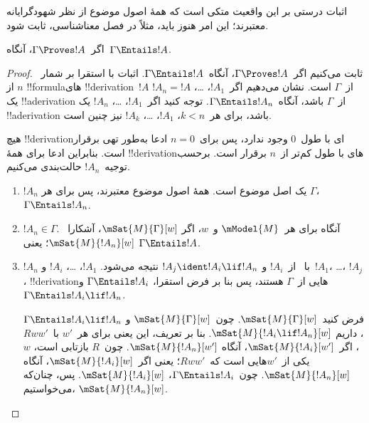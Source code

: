\documentclass[../../../include/open-logic-section]{subfiles}
\begin{document}


\begin{editorial}
  اثبات درستی بر این واقعیت متکی است که همهٔ اصول موضوع از نظر
  شهودگرایانه معتبرند؛ این امر هنوز باید، مثلاً در فصل معناشناسی، ثابت
  شود.
\end{editorial}

\begin{thm}[درستی]
  اگر~$\Gamma \Proves !A$، آنگاه~$\Gamma \Entails !A$.
\end{thm}

\begin{proof}
  ثابت می‌کنیم اگر~$\Gamma \Proves !A$، آنگاه~$\Gamma \Entails !A$.
  اثبات با استقرا بر شمار~$n$ از !!{formula}های !!{derivation}~$!A$
  از~$\Gamma$ است. نشان می‌دهیم اگر~$!A_1$، \dots، $!A_n = !A$ یک
  !!a{derivation} از~$\Gamma$ باشد، آنگاه~$\Gamma \Entails !A_n$.
  توجه کنید اگر~$!A_1$، \dots، $!A_n$ یک !!a{derivation} باشد، برای
  هر~$k<n$، $!A_1$، \dots، $!A_k$ نیز چنین است.

  هیچ !!{derivation}ای با طول~$0$ وجود ندارد، پس برای~$n=0$ ادعا
  به‌طور تهی برقرار است. بنابراین ادعا برای همهٔ !!{derivation}های با
  طول کم‌تر از~$n$ برقرار است. برحسب توجیه~$!A_n$ حالت‌بندی می‌کنیم.
  
  \begin{enumerate}
  \item $!A_n$ یک اصل موضوع است. همهٔ اصول موضوع معتبرند، پس برای هر
    $\Gamma$، $\Gamma \Entails !A_n$.
  \item $!A_n \in \Gamma$. آنگاه برای هر~$\mModel{M}$ و~$w$، اگر
    $\mSat{M}{\Gamma}[w]$، آشکارا~$\mSat{M}{!A_n}[w]$؛ یعنی
    $\Gamma \Entails !A$.
  \item $!A_n$ با~\MP{} از~$!A_i$ و
    $!A_j \ident !A_i \lif !A_n$ نتیجه می‌شود. $!A_1$، \dots، $!A_i$
    و~$!A_1$، \dots، $!A_j$، !!{derivation}هایی از~$\Gamma$ هستند، پس
    بنا بر فرض استقرا، $\Gamma \Entails !A_i$ و
    $\Gamma \Entails !A_i \lif !A_n$.
    
    فرض کنید~$\mSat{M}{\Gamma}[w]$. چون~$\mSat{M}{\Gamma}[w]$ و
    $\Gamma \Entails !A_i \lif !A_n$، داریم
    $\mSat{M}{!A_i \lif !A_n}[w]$. بنا بر تعریف، این یعنی برای هر~$w'$
    با~$Rww'$، اگر~$\mSat{M}{!A_i}[w']$، آنگاه
    $\mSat{M}{!A_n}[w']$. چون~$R$ بازتابی است، $w$ یکی از~$w'$هایی است
    که~$Rww'$؛ یعنی اگر~$\mSat{M}{!A_i}[w]$، آنگاه
    $\mSat{M}{!A_n}[w]$. چون~$\Gamma \Entails !A_i$،
    $\mSat{M}{!A_i}[w]$. پس، چنان‌که می‌خواستیم،
    $\mSat{M}{!A_n}[w]$.
  \end{enumerate}
\end{proof}
\end{document}
